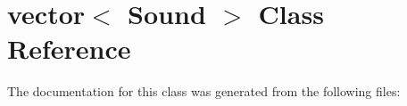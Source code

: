 \hypertarget{classvector_3_01Sound_01_4}{
\section{vector$<$ Sound $>$ Class Reference}
\label{classvector_3_01Sound_01_4}
}


The documentation for this class was generated from the following files: